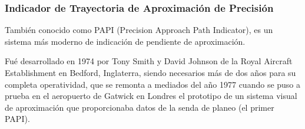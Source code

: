 





\subsubsection{Indicador de Trayectoria de Aproximación de Precisión}
\label{sec:06.02.03.PAPI}

También conocido como PAPI (Precision Approach Path Indicator), es un sistema más moderno de indicación
de pendiente de aproximación.

Fué desarrollado en 1974 por Tony Smith y David Johnson de la Royal Aircraft Establishment en Bedford, Inglaterra,
siendo necesarios más de dos años para su completa operatividad, que se remonta a mediados del año 1977
cuando se puso a prueba en el aeropuerto de Gatwick en Londres el prototipo de un sistema visual de aproximación
que proporcionaba datos de la senda de planeo (el primer PAPI).

